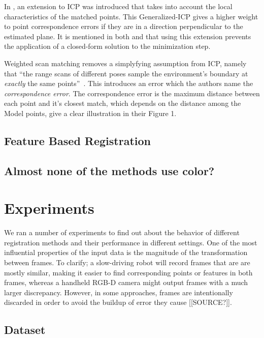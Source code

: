 \documentclass[a4paper]{article}
\begin{document}
In \cite{segal2009generalized}, an extension to \ac{ICP} was introduced that takes into account the local characteristics of the matched points. This Generalized-ICP gives a higher weight to point correspondence errors if they are in a direction perpendicular to the estimated plane. It is mentioned in both \cite{rusinkiewicz2001efficient} and \cite{segal2009generalized} that using this extension prevents the application of a closed-form solution to the minimization step.

Weighted scan matching removes a simplyfying assumption from ICP, namely that ``the range scans of different poses sample the environment's boundary at \emph{exactly} the same points''~\cite{pfister2002weighted}. This introduces an error which the authors name the \emph{correspondence error}. The correspondence error is the maximum distance between each point and it's closest match, which depends on the distance among the Model points, \cite{slamet2008boosting} give a clear illustration in their Figure 1. 

\subsection{Feature Based Registration}



\subsection{Almost none of the methods use color?}


\section{Experiments}

We ran a number of experiments to find out about the behavior of different registration methods and their performance in different settings. One of the most influential properties of the input data is the magnitude of the transformation between frames. To clarify; a slow-driving robot will record frames that are are mostly similar, making it easier to find corresponding points or features in both frames, whereas a handheld RGB-D camera might output frames with a much larger discrepancy. However, in some approaches, frames are intentionally discarded in order to avoid the buildup of error they cause [[SOURCE?]]. 

\subsection{Dataset}
\end{document}
